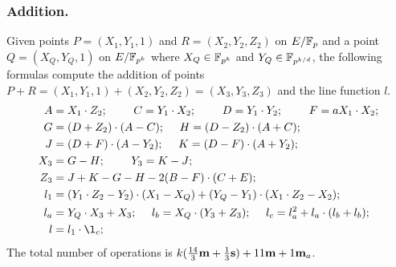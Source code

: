\subsubsection{Addition.}
Given points $P = (X_1,Y_1,1)$ and $R = (X_2,Y_2,Z_2)$ on $E/\mathbb{F}_{p}$ and a point $Q = (X_Q,Y_Q,1)$ on $E/\mathbb{F}_{p^{k}}$
where $X_Q \in \mathbb{F}_{p^{k}}$ and $Y_Q \in \mathbb{F}_{p^{k/d}}$,
the following formulas compute the addition of points $P + R = (X_1,Y_1,1) + (X_2,Y_2,Z_2) = (X_3,Y_3,Z_3)$ and the line function $l$.
\begin{align*}
A &= X_1 \cdot Z_2;\	\qquad
C = Y_1 \cdot X_2;\	\qquad
D = Y_1 \cdot Y_2;\	\qquad
F = a X_1 \cdot X_2;\\
G &= (D + Z_2) \cdot (A - C);\	\quad
H = (D - Z_2) \cdot (A + C);\\
J &= (D + F) \cdot (A - Y_2);\	\quad
K = (D - F) \cdot (A + Y_2);\\
X_3 &= G - H;\	\qquad
Y_3 = K - J;\\
Z_3 &= J + K - G - H - 2(B - F) \cdot (C + E);\\
l_1 &= (Y_1 \cdot Z_2 - Y_2) \cdot (X_1 - X_Q) + (Y_Q - Y_1) \cdot (X_1 \cdot Z_2 - X_2);\\
l_a &= Y_Q \cdot X_3 + X_3;\	\quad
l_b = X_Q \cdot (Y_3 + Z_3);\	\quad
l_c = l_a^2 + l_a \cdot (l_b + l_b);\\
l &= l_1 \cdot \l_c;
\end{align*}
The total number of operations is
$ k(\frac{14}{3}\textbf{m} + \frac{1}{3}\textbf{s}) + 11\textbf{m} + 1\textbf{m}_a$.


